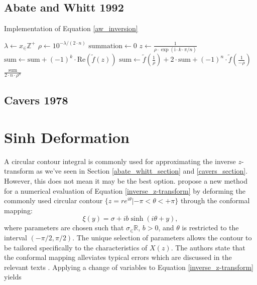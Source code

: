 \documentclass[a4paper]{report}
\begin{document}
\subsection{Abate and Whitt 1992}

\begin{algorithm}[H]
    \caption{Implementation of Equation \ref{aw_inversion}}
    \begin{algorithmic}[1]
        \State $\lambda \gets x_\in \mathbb{Z}^+$
        \State $\rho \gets 10^{-\lambda / (2 \cdot n)}$
        \State $\text{summation} \gets 0$
            \State $z \gets \frac{1}{\rho \cdot \exp(\text{i} \cdot k \cdot \pi / n)}$
            \State $\text{sum} \gets \text{sum} + (-1)^k \cdot \text{Re}(\tilde{f}(z))$
        \EndFor
        \State $\text{sum} \gets \tilde{f}(\frac{1}{\rho}) + 2 \cdot \text{sum} + (-1)^n \cdot \tilde{f}(\frac{1}{-\rho})$
        \State \Return $\frac{\text{sum}}{2 \cdot n \cdot \rho^n}$
    \EndProcedure
    \end{algorithmic}
\end{algorithm}

\subsection{Cavers 1978}

\section{Sinh Deformation}
A circular contour integral is commonly used for approximating the inverse $z$-transform as we've seen in Section \ref{abate_whitt_section} and \ref{cavers_section}. However, this does not mean it may be the best option. \citet{levendorskii2022sinh} propose a new method for a numerical evaluation of Equation \ref{inverse_z-transform} by deforming the commonly used circular contour $\{z = re^{i\theta} | -\pi < \theta < +\pi\}$ through the conformal mapping:
\begin{equation}\label{equation:conformal_mapping}
    \xi(y) = \sigma + ib\sinh(i\theta + y),
\end{equation}
where parameters are chosen such that $\sigma_\in \mathbb{R}$, $b > 0$, and $\theta$ is restricted to the interval $(-\pi/2, \pi / 2)$. The unique selection of parameters allows the contour to be tailored specifically to the characteristics of $X(z)$. The authors state that the conformal mapping alleviates typical errors which are discussed in the relevant texts \citep{boyarchenko2014efficient, boyarchenko2019sinh, schmelzer2007computing}.  Applying a change of variables to Equation \ref{inverse_z-transform} yields
\end{document}
